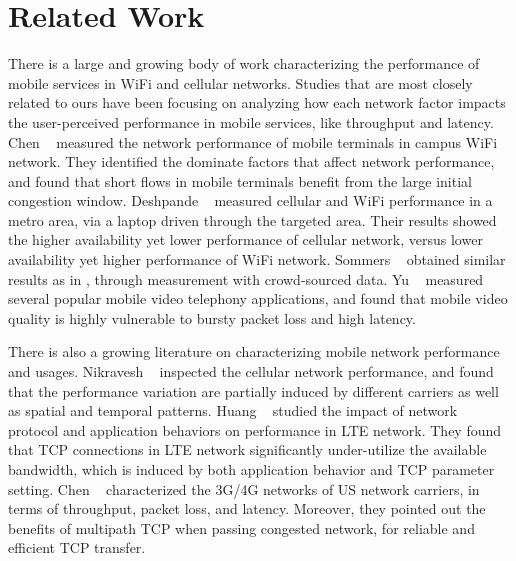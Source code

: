 
\section{Related Work}
\label{sec:related}

There is a large and growing body of work characterizing the performance of mobile services in WiFi and cellular networks. Studies that are most closely related to ours have been focusing on analyzing how each network factor impacts the user-perceived performance in mobile services, like throughput and latency. Chen \etal~\cite{chen2012network} measured the network performance of mobile terminals in campus WiFi network. They identified the dominate factors that affect network performance, and found that short flows in mobile terminals benefit from the large initial congestion window. Deshpande \etal~\cite{deshpande2010performance} measured cellular and WiFi performance in a metro area, via a laptop driven through the targeted area. Their results showed the higher availability yet lower performance of cellular network, versus lower availability yet higher performance of WiFi network. Sommers \etal~\cite{sommers2012cell} obtained similar results as in \cite{deshpande2010performance}, through measurement with crowd-sourced data. Yu \etal~\cite{yu2014can} measured several popular mobile video telephony applications, and found that mobile video quality is highly vulnerable to bursty packet loss and high latency. 

There is also a growing literature on characterizing mobile network performance and usages. Nikravesh \etal~\cite{nikravesh2014mobile} inspected the cellular network performance, and found that the performance variation are partially induced by different carriers as well as spatial and temporal patterns. Huang \etal~\cite{huang2013depth} studied the impact of network protocol and application behaviors on performance in LTE network. They found that TCP connections in LTE network significantly under-utilize the available bandwidth, which is induced by both application behavior and TCP parameter setting. Chen \etal~\cite{UM-CS-2012-022} characterized the 3G/4G networks of US network carriers, in terms of throughput, packet loss, and latency. Moreover, they pointed out the benefits of multipath TCP when passing congested network, for reliable and efficient TCP transfer.

